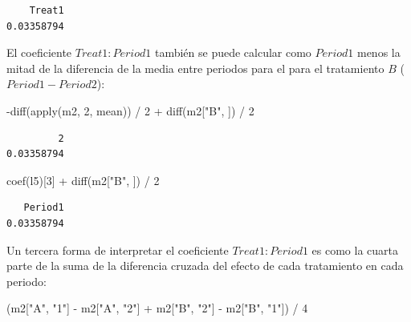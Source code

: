 \documentclass[
  12pt,
  a4paper,
  extrafontsizes,
  onecolumn,
  openright]{memoir}
\newenvironment{Shaded}{\begin{snugshade}}{\end{snugshade}}
\newcommand{\DecValTok}[1]{\textcolor[rgb]{0.68,0.00,0.00}{#1}}
\newcommand{\FunctionTok}[1]{\textcolor[rgb]{0.28,0.35,0.67}{#1}}
\newcommand{\NormalTok}[1]{\textcolor[rgb]{0.00,0.23,0.31}{#1}}
\newcommand{\SpecialCharTok}[1]{\textcolor[rgb]{0.37,0.37,0.37}{#1}}
\newcommand{\StringTok}[1]{\textcolor[rgb]{0.13,0.47,0.30}{#1}}
\begin{document}
\begin{verbatim}
    Treat1 
0.03358794 
\end{verbatim}

\normalsize

El coeficiente \(Treat1:Period1\) también se puede calcular como
\(Period1\) menos la mitad de la diferencia de la media entre periodos
para el para el tratamiento \(B\) (\(Period1-Period2\)):

\scriptsize

\begin{Shaded}
\begin{Highlighting}[]
\SpecialCharTok{{-}}\FunctionTok{diff}\NormalTok{(}\FunctionTok{apply}\NormalTok{(m2, }\DecValTok{2}\NormalTok{, mean)) }\SpecialCharTok{/} \DecValTok{2} \SpecialCharTok{+} \FunctionTok{diff}\NormalTok{(m2[}\StringTok{"B"}\NormalTok{, ]) }\SpecialCharTok{/} \DecValTok{2}
\end{Highlighting}
\end{Shaded}

\begin{verbatim}
         2 
0.03358794 
\end{verbatim}

\begin{Shaded}
\begin{Highlighting}[]
\FunctionTok{coef}\NormalTok{(l5)[}\DecValTok{3}\NormalTok{] }\SpecialCharTok{+} \FunctionTok{diff}\NormalTok{(m2[}\StringTok{"B"}\NormalTok{, ]) }\SpecialCharTok{/} \DecValTok{2}
\end{Highlighting}
\end{Shaded}

\begin{verbatim}
   Period1 
0.03358794 
\end{verbatim}

\normalsize

Un tercera forma de interpretar el coeficiente \(Treat1:Period1\) es
como la cuarta parte de la suma de la diferencia cruzada del efecto de
cada tratamiento en cada periodo:

\scriptsize

\begin{Shaded}
\begin{Highlighting}[]
\NormalTok{(m2[}\StringTok{"A"}\NormalTok{, }\StringTok{"1"}\NormalTok{] }\SpecialCharTok{{-}}\NormalTok{ m2[}\StringTok{"A"}\NormalTok{, }\StringTok{"2"}\NormalTok{] }\SpecialCharTok{+}\NormalTok{ m2[}\StringTok{"B"}\NormalTok{, }\StringTok{"2"}\NormalTok{] }\SpecialCharTok{{-}}\NormalTok{ m2[}\StringTok{"B"}\NormalTok{, }\StringTok{"1"}\NormalTok{]) }\SpecialCharTok{/} \DecValTok{4}
\end{Highlighting}
\end{Shaded}
\end{document}
